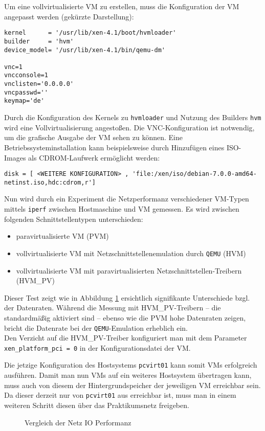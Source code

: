 Um eine vollvirtualisierte VM zu erstellen, muss die Konfiguration der VM angepasst werden (gekürzte Darstellung):
\setupVerbatimOut
\begin{verbatim}
kernel      = '/usr/lib/xen-4.1/boot/hvmloader'
builder     = 'hvm'
device_model= '/usr/lib/xen-4.1/bin/qemu-dm'

vnc=1
vncconsole=1
vnclisten='0.0.0.0'
vncpasswd=''
keymap='de'
\end{verbatim}

Durch die Konfiguration des Kernels zu \verb#hvmloader# und Nutzung des Builders \verb#hvm# wird eine Vollvirtualisierung angestoßen. Die VNC-Konfiguration ist notwendig, um die grafische Ausgabe der VM sehen zu können. Eine Betriebssysteminstallation kann beispielsweise durch Hinzufügen eines ISO-Images als CDROM-Laufwerk ermöglicht werden: 
\setupVerbatimOut
\begin{verbatim}
disk = [ <WEITERE KONFIGURATION> , 'file:/xen/iso/debian-7.0.0-amd64-netinst.iso,hdc:cdrom,r']
\end{verbatim}

Nun wird durch ein Experiment die Netzperformanz verschiedener VM-Typen mittels \verb#iperf# zwischen Hostmaschine und VM gemessen. Es wird zwischen folgenden Schnittstellentypen unterschieden:
\begin{itemize}
\item paravirtualisierte VM (PVM)
\item vollvirtualisierte VM mit Netzschnittstellenemulation durch \verb#QEMU# (HVM)
\item vollvirtualisierte VM mit paravirtualisierten Netzschnittstellen-Treibern (HVM\_PV)
\end{itemize}

Dieser Test zeigt wie in Abbildung \ref{megaplot} ersichtlich signifikante Unterschiede bzgl. der Datenraten. Während die Messung mit HVM\_PV-Treibern -- die standardmäßig aktiviert sind -- ebenso wie die PVM hohe Datenraten zeigen, bricht die Datenrate bei der \verb#QEMU#-Emulation erheblich ein.
\\
Den Verzicht auf die HVM\_PV-Treiber konfiguriert man mit dem Parameter \verb#xen_platform_pci = 0# in der Konfigurationsdatei der VM.

Die jetzige Konfiguration des Hostsystems \verb#pcvirt01# kann somit VMs erfolgreich ausführen. Damit man nun VMs auf ein weiteres Hostsystem übertragen kann, muss auch von diesem der Hintergrundspeicher der jeweiligen VM erreichbar sein. Da dieser derzeit nur von \verb#pcvirt01# aus erreichbar ist, muss man in einem weiteren Schritt diesen über das Praktikumsnetz freigeben.
\begin{figure}

\caption{Vergleich der Netz IO Performanz}
\label{megaplot}
\end{figure}
